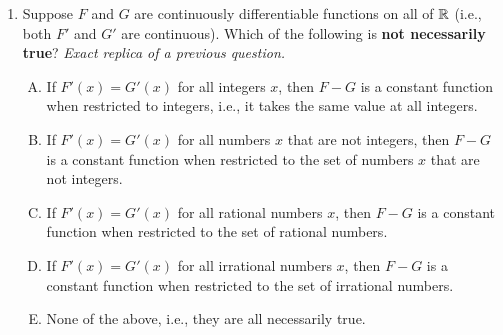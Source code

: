 \documentclass[10pt]{amsart}
\begin{document}
\begin{enumerate}
    {\em Answer}: Option (B)

  {\em Explanation}: The problem with option (B) arises when one or
  both functions take negative values. For instance, consider the case
  $f(x) := x$ and $g(x) := x$. Both are increasing functions on all of
  $\R$. However, the pointwise product is the function $x \mapsto
  x^2$, which is a decreasing function for negative $x$.

  Formally, the issue is that we cannot multiply inequalities of the
  form $A < B$ and $C < D$ unless we are guaranteed to be working with
  positive numbers.

  {\em The other choices}:

  Option (A): For any $x_1 <
  x_2$, we have $f(x_1) < f(x_2)$ and $g(x_1) < g(x_2)$. Adding up, we
  get $f(x_1) + g(x_1) < f(x_2) + g(x_2)$, so $(f + g)(x_1) < (f + g)(x_2)$.

  Option (C): For any $x_1 < x_2$, we have $g(x_1) < g(x_2)$ since $g$
  is increasing. Now, we use the factthat $f$ is increasing to compare
  its values at the two points $g(x_1)$ and $g(x_2)$, and we get
  $f(g(x_1)) < f(g(x_2))$. We thus get $(f \circ g)(x_1) < (f \circ
  g)(x_2)$.

  {\em Performance review}: $7$ out of $12$ got this correct. $4$
  chose (C), $1$ chose (E).

  {\em Historical note (last year)}: $9$ out of $16$ people got this
  correct. $3$ people chose (C) and $2$ people each chose (D) and (E).

  {\em Historical note (last year, previous quiz)}: When this question
  appeared earlier on October 20, only $1$ out of $15$ people got it
  correct.

\item Suppose $F$ and $G$ are continuously differentiable functions on
  all of $\R$ (i.e., both $F'$ and $G'$ are continuous). Which of the
  following is {\bf not necessarily true}? {\em Exact replica of a
  previous question.}

  \begin{enumerate}[(A)]
  \item If $F'(x) = G'(x)$ for all integers $x$, then $F - G$ is a
    constant function when restricted to integers, i.e., it takes the
    same value at all integers.
  \item If $F'(x) = G'(x)$ for all numbers $x$ that are not integers,
    then $F - G$ is a constant function when restricted to the set of
    numbers $x$ that are not integers.
  \item If $F'(x) = G'(x)$ for all rational numbers $x$, then $F - G$
    is a constant function when restricted to the set of rational
    numbers.
  \item If $F'(x) = G'(x)$ for all irrational numbers $x$, then $F -
    G$ is a constant function when restricted to the set of irrational
    numbers.
  \item None of the above, i.e., they are all necessarily true.
  \end{enumerate}


\end{enumerate}
\end{document}
